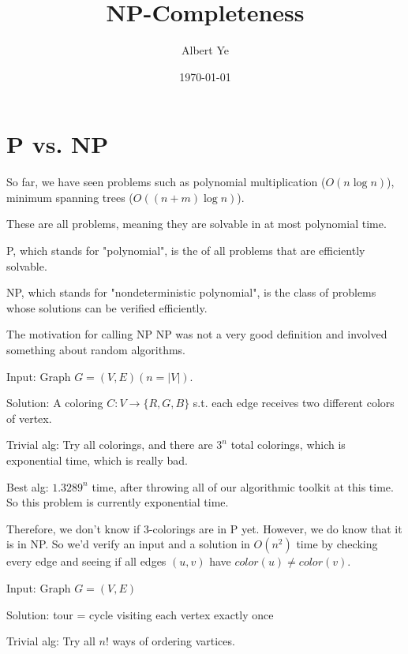 \documentclass{article}
\title{NP-Completeness}
\author{Albert Ye}
\date{\today}
\begin{document}
    \maketitle
    \section{P vs. NP}
    So far, we have seen problems such as polynomial multiplication ($O(n \log n)$), minimum spanning trees ($O((n + m) \log n)$). 

    These are all  problems, meaning they are solvable in at most polynomial time.

    \begin{defn}[P]
        P, which stands for "polynomial", is the  of all problems that are efficiently solvable.
    \end{defn}

    \begin{defn}[NP]
        NP, which stands for "nondeterministic polynomial", is the class of problems whose solutions can be verified efficiently.
    \end{defn}

    The motivation for calling NP NP was not a very good definition and involved something about random algorithms. 

    \begin{ex}[3-coloring]
        Input: Graph $G = (V, E) (n = |V|)$. 

        Solution: A coloring $C : V \to \{R, G, B\}$ s.t. each edge receives two different colors of vertex.
    \end{ex}

    Trivial alg: Try all colorings, and there are $3^n$ total colorings, which is exponential time, which is really bad.

    Best alg: $1.3289^n$ time, after throwing all of our algorithmic toolkit at this time. So this problem is currently exponential time. 

    Therefore, we don't know if 3-colorings are in P yet. However, we do know that it is in NP. So we'd verify an input and a solution in $O(n^2)$ time by checking every edge and seeing if all edges $(u, v)$ have $color(u) \neq color(v)$.

    \begin{ex}
        Input: Graph $G = (V, E)$

        Solution: tour = cycle visiting each vertex exactly once
    \end{ex}
    Trivial alg: Try all $n!$ ways of ordering vartices.
\end{document}
